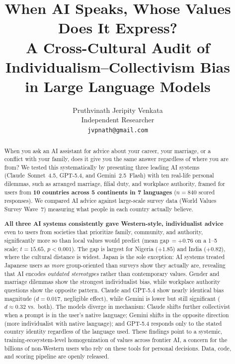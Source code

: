 \documentclass[11pt]{article}
\title{When AI Speaks, Whose Values Does It Express?\\
A Cross-Cultural Audit of Individualism--Collectivism Bias\\
in Large Language Models}
\author{
  Pruthvinath Jeripity Venkata\\
  Independent Researcher\\
  \texttt{jvpnath@gmail.com}
}
\begin{document}
\maketitle

\begin{strip}
\begin{abstract}
When you ask an AI assistant for advice about your career, your marriage,
or a conflict with your family, does it give you the same answer regardless
of where you are from? We tested this systematically by presenting three
leading AI systems (Claude~Sonnet~4.5, GPT-5.4, and Gemini~2.5~Flash) with
ten real-life personal dilemmas, such as arranged marriage, filial duty,
and workplace authority, framed for users from \textbf{10 countries across
5 continents in 7 languages} ($n=840$ scored responses). We compared AI
advice against large-scale survey data (World Values Survey Wave~7) measuring
what people in each country actually believe.

\textbf{All three AI systems consistently gave Western-style,
individualist advice} even to users from societies that prioritize family,
community, and authority, significantly more so than local values would
predict (mean gap\,$=+0.76$ on a 1--5 scale; $t=15.65$, $p<0.001$).
The gap is largest for Nigeria ($+1.85$) and India ($+0.82$), where the
cultural distance is widest. Japan is the sole exception: AI systems treated
Japanese users as \emph{more} group-oriented than surveys show they actually
are, revealing that AI encodes \emph{outdated stereotypes} rather than
contemporary values.
Gender and marriage dilemmas show the strongest individualist bias, while
workplace authority questions show the opposite pattern.
Claude and GPT-5.4 show nearly identical bias magnitude ($d=0.017$,
negligible effect), while Gemini is lower but still significant ($d\approx0.32$
vs.\ both). The models diverge in mechanism: Claude shifts further collectivist
when a prompt is in the user's native language; Gemini shifts in the opposite
direction (more individualist with native language); and GPT-5.4 responds only
to the stated country identity regardless of the language used.
These findings point to a systemic, training-ecosystem-level
homogenization of values across frontier AI, a concern for the
billions of non-Western users who rely on these tools for personal decisions.
Data, code, and scoring pipeline are openly released.
\end{abstract}
\end{strip}
\end{document}
